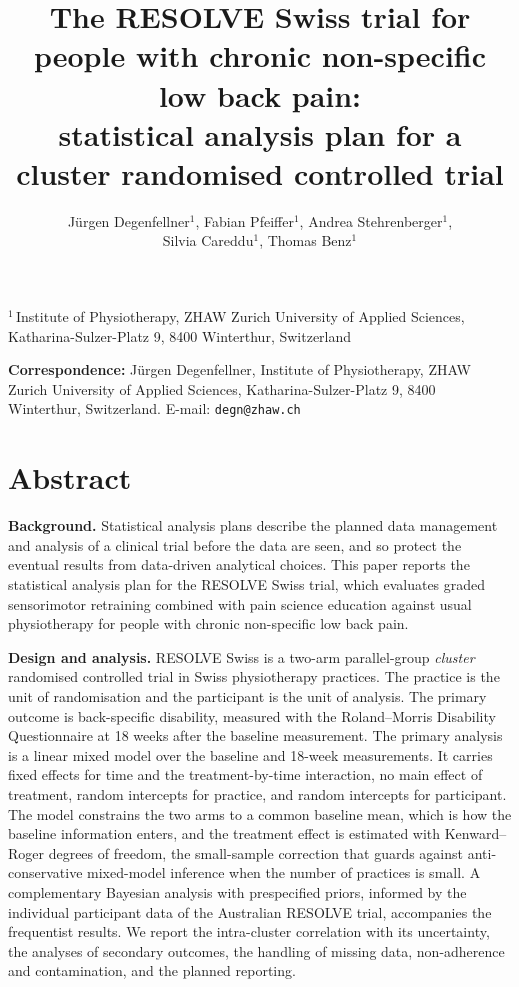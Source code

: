 \documentclass[11pt,a4paper]{article}
\title{\Large\bfseries The RESOLVE Swiss trial for people with chronic
non-specific low back pain:\\
statistical analysis plan for a cluster randomised controlled trial}
\author{Jürgen Degenfellner$^{1}$, Fabian Pfeiffer$^{1}$, Andrea Stehrenberger$^{1}$,\\
Silvia Careddu$^{1}$, Thomas Benz$^{1}$}
\date{}
\begin{document}
\linenumbers
\maketitle

{\small
\noindent $^{1}$\,Institute of Physiotherapy, ZHAW Zurich University of
Applied Sciences, Katharina-Sulzer-Platz 9, 8400 Winterthur, Switzerland

\noindent\textbf{Correspondence:} Jürgen Degenfellner, Institute of
Physiotherapy, ZHAW Zurich University of Applied Sciences,
Katharina-Sulzer-Platz 9, 8400 Winterthur, Switzerland.
E-mail: \texttt{degn@zhaw.ch}
}

\vspace{0.4em}

\section*{Abstract}

\textbf{Background.} Statistical analysis plans describe the planned data
management and analysis of a clinical trial before the data are seen, and so
protect the eventual results from data-driven analytical choices. This paper
reports the statistical analysis plan for the RESOLVE Swiss trial, which
evaluates graded sensorimotor retraining combined with pain science
education against usual physiotherapy for people with chronic non-specific
low back pain.

\textbf{Design and analysis.} RESOLVE Swiss is a two-arm parallel-group
\emph{cluster} randomised controlled trial in Swiss physiotherapy practices.
The practice is the unit of randomisation and the participant is the unit of
analysis. The primary outcome is back-specific disability, measured with the
Roland--Morris Disability Questionnaire at 18 weeks after the baseline
measurement. The
primary analysis is a linear mixed model over the baseline and 18-week
measurements. It carries fixed effects for time and the treatment-by-time
interaction, no main effect of treatment, random intercepts for practice, and
random intercepts for participant. The model constrains the two arms to a common baseline
mean, which is how the baseline information enters, and the treatment effect
is estimated with Kenward--Roger degrees of freedom, the small-sample
correction that guards against anti-conservative mixed-model inference when
the number of practices is small. A complementary Bayesian analysis with
prespecified priors, informed by the individual participant data of the
Australian RESOLVE trial, accompanies the frequentist results. We report the intra-cluster correlation with its
uncertainty, the analyses of secondary outcomes, the handling of missing data,
non-adherence and contamination, and the planned reporting.
\end{document}
